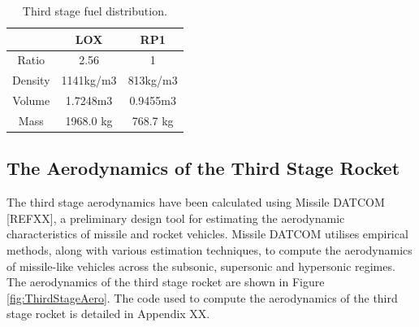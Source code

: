 		\begin{table}[h]
			\centering
\begin{tabular}{|c|c|c|}
	\hline  & \textbf{LOX} & \textbf{RP1} \\ 
	\hline Ratio & 2.56 & 1 \\ 
	\hline Density & 1141kg/m3 & 813kg/m3 \cite{Magee}\\ 
	\hline Volume & 1.7248m3 & 0.9455m3 \\ 
	\hline Mass & 1968.0 kg & 768.7 kg \\ 
	\hline 
\end{tabular} 
\caption{Third stage fuel distribution.}
\label{tab:Fuel}
		\end{table}

		
		

		\subsection{The Aerodynamics of the Third Stage Rocket}
		
		The third stage aerodynamics have been calculated using Missile DATCOM [REFXX], a preliminary design tool for estimating the aerodynamic characteristics of missile and rocket vehicles. Missile DATCOM utilises empirical methods, along with various estimation techniques, to compute the aerodynamics of missile-like vehicles across the subsonic, supersonic and hypersonic regimes. The aerodynamics of the third stage rocket are shown in Figure \ref{fig:ThirdStageAero}. The code used to compute the aerodynamics of the third stage rocket is detailed in Appendix XX.  
		
